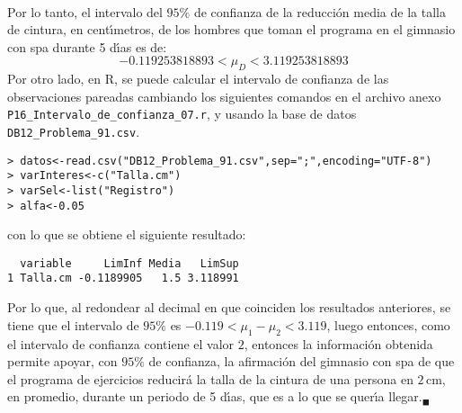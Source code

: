 \begin{solucion}
\begin{eqnarray*}
 \end{eqnarray*}
 Por lo tanto, el intervalo del $95\%$ de confianza de la reducci\'on media de la talla de cintura, en cent\'{\i}metros, de los hombres que toman el programa en el gimnasio con spa durante 5 d\'{\i}as es de:
 \begin{equation*}
  -0.119253818893 < \mu_D < 3.119253818893
 \end{equation*}
 Por otro lado, en R, se puede calcular el intervalo de confianza de las observaciones pareadas cambiando los siguientes comandos en el archivo anexo \texttt{P16\_Intervalo\_de\_confianza\_07.r}, y usando la base de datos \texttt{DB12\_Problema\_91.csv}.
 \begin{verbatim}
> datos<-read.csv("DB12_Problema_91.csv",sep=";",encoding="UTF-8")
> varInteres<-c("Talla.cm")
> varSel<-list("Registro")
> alfa<-0.05
 \end{verbatim}
 \vspace{-0.5cm}
 con lo que se obtiene el siguiente resultado:
 \begin{verbatim}
  variable     LimInf Media   LimSup
1 Talla.cm -0.1189905   1.5 3.118991
 \end{verbatim}
 \vspace{-0.5cm}
 Por lo que, al redondear al decimal en que coinciden los resultados anteriores, se tiene que el intervalo de $95\%$ es $-0.119 < \mu_1 - \mu_2 < 3.119$, luego entonces, como el intervalo de confianza contiene el valor $2$, entonces la informaci\'on obtenida permite apoyar, con $95\%$ de confianza, la afirmaci\'on del gimnasio con spa de que el programa de ejercicios reducir\'a la talla de la cintura de una persona en $2\,$cm, en promedio, durante un periodo de 5 d\'{\i}as, que es a lo que se quer\'{\i}a llegar.${}_{\blacksquare}$
\end{solucion}
